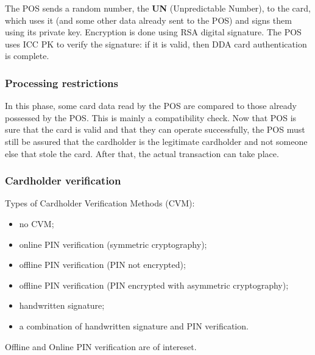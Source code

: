 \documentclass[a4paper, 10pt, titlepage]{article}
\begin{document}
The POS sends a random number, the \textbf{UN} (Unpredictable Number), to the card, which uses it (and some other data already sent to the POS) and signs them using its private key. Encryption is done using RSA digital signature. The POS uses ICC PK to verify the signature: if it is valid, then DDA card authentication is complete.

\subsubsection{Processing restrictions}
In this phase, some card data read by the POS are compared to those already possessed by the POS. This is mainly a compatibility check. Now that POS is sure that the card is valid and that they can operate successfully, the POS must still be assured that the cardholder is the legitimate cardholder and not someone else that stole the card. After that, the actual transaction can take place. 

\subsubsection{Cardholder verification}
Types of Cardholder Verification Methods (CVM):
\begin{itemize}
\item no CVM;
\item online PIN verification (symmetric cryptography);
\item offline PIN verification (PIN not encrypted);
\item offline PIN verification (PIN encrypted with asymmetric cryptography);
\item handwritten signature;
\item a combination of handwritten signature and PIN verification.
\end{itemize}
Offline and Online PIN verification are of intereset.
\end{document}

